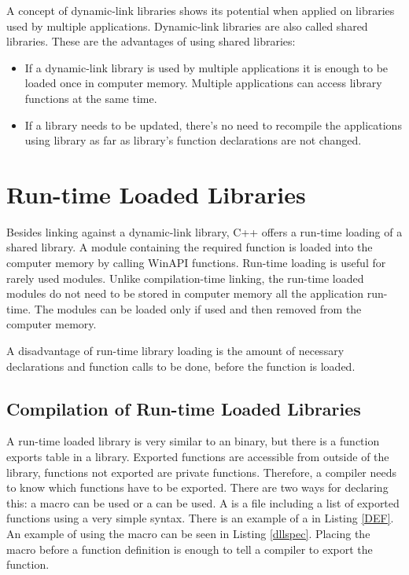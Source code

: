 A concept of dynamic-link libraries shows its potential when applied on libraries used by multiple applications. Dynamic-link libraries are also called shared libraries. These are the advantages of using shared libraries:

\begin{itemize}
\item If a dynamic-link library is used by multiple applications it is enough to be loaded once in computer memory. Multiple applications can access library functions at the same time.
\item If a library needs to be updated, there's no need to recompile the applications using library as far as library's function declarations are not changed.
\end{itemize}


\section{Run-time Loaded Libraries}

Besides linking against a dynamic-link library, C++ offers a run-time loading of a shared library. A module containing the required function is loaded into the computer memory by calling WinAPI functions. Run-time loading is useful for rarely used modules. Unlike compilation-time linking, the run-time loaded modules do not need to be stored in computer memory all the application run-time. The modules can be loaded only if used and then removed from the computer memory.

A disadvantage of run-time library loading is the amount of necessary declarations and function calls to be done, before the function is loaded.

\subsection{Compilation of Run-time Loaded Libraries}


A run-time loaded  library is very similar to an  binary, but there is a function exports table in a  library\cite{msdn}. Exported functions are accessible from outside of the library, functions not exported are private functions. Therefore, a compiler needs to know which functions have to be exported. There are two ways for declaring this: a  macro can be used or a  can be used. A  is a file including a list of exported functions using a very simple syntax. There is an example of a  in Listing \ref{DEF}. An example of using the  macro can be seen in Listing \ref{dllspec}. Placing the macro before a function definition is enough to tell a compiler to export the function.


